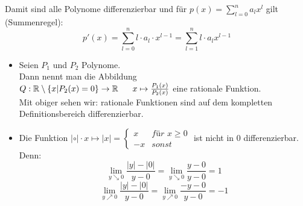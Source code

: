 Damit sind alle Polynome differenzierbar und für 
$p(x) = \sum_{l=0}^{n} a_l x^l$ gilt (Summenregel):
\begin{equation*}p'(x) = \sum_{l = 0}^n l \cdot a_l \cdot x^{l-1} 
= \sum_{l=1}^n l \cdot a_l x^{l-1}
\end{equation*}

\begin{itemize}
	\item Seien $P_1$ und $P_2$ Polynome. \\
	Dann nennt man die Abbildung \\
	\noindent\hspace*{5mm}$Q : \mathbb{R}\setminus\{x|P_2(x) = 0\}
	\rightarrow \mathbb{R} \\
	\noindent\hspace*{6mm}x \mapsto \frac{P_1(x)}{P_2(x)}$ 
	eine rationale Funktion. \\
	Mit obiger sehen wir: rationale Funktionen sind auf dem kompletten
	 Definitionsbereich differenzierbar.
	 
	\item Die Funktion $|\circ | \cdot x \mapsto |x| = \begin{cases}x  & \textit{für } x\geq 0 \\ - x & sonst \end{cases}$
	ist nicht in 0 differenzierbar. Denn: \\
	\begin{equation*}
	\lim\limits_{y \searrow 0}{\frac{|y|-|0|}{y-0}}
	= \lim\limits_{y \searrow 0}{\frac{y-0}{y-0}} = 1 
	\end{equation*}
	\begin{equation*}
	\lim\limits_{y \nearrow 0}{\frac{|y| -|0|}{y-0}} = \lim\limits_{y 
	\nearrow 0}{\frac{-y-0}{y-0}} = -1
	\end{equation*}
\end{itemize}


